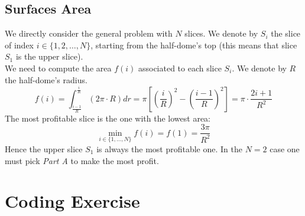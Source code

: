 \documentclass{article}
\theoremstyle{definition}
\theoremstyle{definition}
\theoremstyle{definition}
\begin{document}
\subsection{Surfaces Area}

We directly consider the general problem with $N$ slices. We denote by $S_i$ the slice of index $i\in\lbrace 1,2,\ldots,N\rbrace$, starting from the half-dome's top (this means that slice $S_1$ is the upper slice).\\

We need to compute the area $f(i)$ associated to each slice $S_i$. We denote by $R$ the half-dome's radius.
$$ f(i) = \int_{\frac{i-1}{R}}^{\frac{i}{R}} \left( 2\pi\cdot R \right) dr = \pi \left[ \left(\frac{i}{R}\right)^2 - \left(\frac{i - 1}{R}\right)^2 \right] = \pi \cdot \frac{2i + 1}{R^2}$$
The most profitable slice is the one with the lowest area:
$$ \min_{i\in\lbrace 1,\ldots,N\rbrace } f(i) = f(1) = \frac{3\pi}{R^2} $$
Hence the upper slice $S_1$ is always the most profitable one. In the $N=2$ case one must pick \textit{Part A} to make the most profit.

\section{Coding Exercise}
\end{document}
